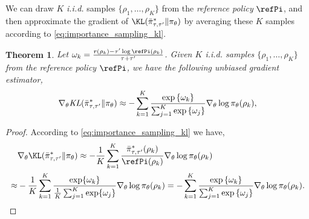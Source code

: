 \documentclass{article}
\newtheorem{thm}{Theorem}
\begin{document}
We can draw $K$ \textit{i.i.d.} samples $\{\rho_1, \dots, \rho_K\}$ from the \emph{reference policy} $\refPi$, and then approximate the gradient of $\KL(\bar{\pi}_{\tau,\tau^{\prime}}^* \| \pi_\theta)$ by averaging these $K$ samples according to \cref{eq:importance_sampling_kl}. 

\begin{thm}
	\label{thm:repmdgradientestimate}
	Let $\omega_k = \frac{r(\rho_k) - \tau^{\prime} \log{\refPi(\rho_k)} }{\tau + \tau^{\prime}}
$. Given $K$ \emph{i.i.d.} samples $\{\rho_1, \dots, \rho_K\}$ from the \emph{reference policy} $\refPi$, we have the following unbiased gradient estimator,
	\begin{equation}
	\label{eq:gradient_estimator}
	\nabla_{\theta} \text{\em KL}(\bar{\pi}_{\tau,\tau^{\prime}}^* \| \pi_\theta)\approx -\sum\limits_{k=1}^K{ \frac{ \exp\left\{ \omega_k \right\} }{ \sum_{j=1}^K{ \exp\left\{ \omega_j \right\}}} \nabla_{\theta} \log{\pi_\theta(\rho_k)} },
	\end{equation}
\end{thm}
\begin{proof}
	According to \cref{eq:importance_sampling_kl} we have,
	\begin{equation}
	\begin{split}
	&\nabla_{\theta} \KL(\bar{\pi}_{\tau,\tau^{\prime}}^* \| \pi_\theta) \approx -\frac{1}{K}\sum_{k=1}^K \frac{\bar{\pi}_{\tau,\tau^{\prime}}^* (\rho_k)}{\refPi(\rho_k)} \nabla_{\theta} \log \pi_\theta(\rho_k) \\ 
	\approx & -\frac{1}{K}\sum_{k=1}^K \frac{\exp \{\omega_k\}} {\frac{1}{K} \sum_{j=1}^K \exp \{\omega_j\}} \nabla_{\theta} \log \pi_\theta(\rho_k) =  -\sum\limits_{k=1}^K{ \frac{ \exp\left\{ \omega_k \right\} }{ \sum_{j=1}^K{ \exp\left\{ \omega_j \right\}}} \nabla_{\theta} \log{\pi_\theta(\rho_k)} } \qedhere.
	\end{split}
	\end{equation}
\end{proof}

%

\end{document}
